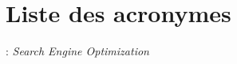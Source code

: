 
\chapter*{Liste des acronymes}
\begin{acronym}
	\Large
	 :  {\emph{Search Engine Optimization}}

\end{acronym}
\normalsize